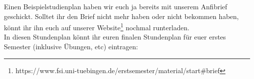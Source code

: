 Einen Beispielstudienplan haben wir euch ja bereits mit unserem Anfibrief geschickt. Solltet ihr den Brief nicht mehr haben oder nicht bekommen haben, könnt ihr ihn euch auf unserer Website\footnote{https://www.fsi.uni-tuebingen.de/erstsemester/material/start\#brief} nochmal runterladen.\\
In diesen Stundenplan könnt ihr euren finalen Stundenplan für euer erstes Semester (inklusive Übungen, etc) eintragen:

\vfill


